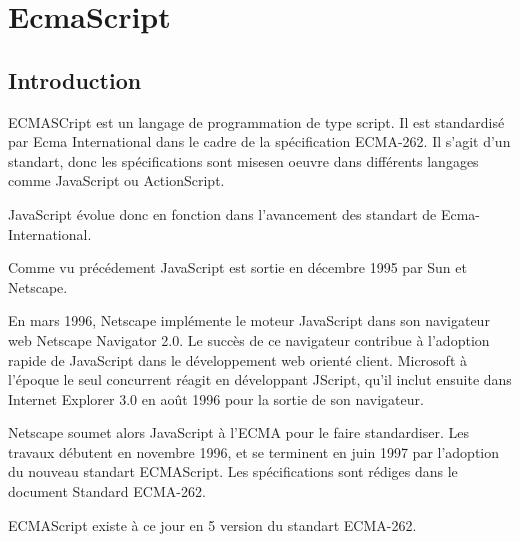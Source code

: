 \chapter{EcmaScript}
\label{ch:ecmascript}

\section*{Introduction}

ECMASCript est un langage de programmation de type script. Il est standardisé par Ecma International dans le cadre de la spécification ECMA-262. Il s’agit d’un standart, donc les spécifications sont misesen oeuvre dans différents langages comme JavaScript ou ActionScript.

JavaScript évolue donc en fonction dans l’avancement des standart de Ecma-International.

Comme vu précédement JavaScript est sortie en décembre 1995 par Sun et Netscape.

En mars 1996, Netscape implémente le moteur JavaScript dans son navigateur web Netscape Navigator 2.0. Le succès de ce navigateur contribue à l’adoption rapide de JavaScript dans le développement web orienté client. Microsoft à l’époque le seul concurrent réagit en développant JScript, qu’il inclut ensuite dans Internet Explorer 3.0 en août 1996 pour la sortie de son navigateur.

Netscape soumet alors JavaScript à l’ECMA pour le faire standardiser. Les travaux débutent en novembre 1996, et se terminent en juin 1997 par l’adoption du nouveau standart ECMAScript. Les spécifications sont rédiges dans le document Standard ECMA-262.

ECMAScript existe à ce jour en 5 version du standart ECMA-262.